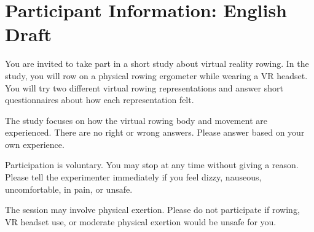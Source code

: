 \section{Participant Information: English Draft}
\label{app:study_materials_participant_information_english}

You are invited to take part in a short study about virtual reality rowing. In the study, you will row on a physical rowing ergometer while wearing a VR headset. You will try two different virtual rowing representations and answer short questionnaires about how each representation felt.

The study focuses on how the virtual rowing body and movement are experienced. There are no right or wrong answers. Please answer based on your own experience.

Participation is voluntary. You may stop at any time without giving a reason. Please tell the experimenter immediately if you feel dizzy, nauseous, uncomfortable, in pain, or unsafe.

The session may involve physical exertion. Please do not participate if rowing, VR headset use, or moderate physical exertion would be unsafe for you.



